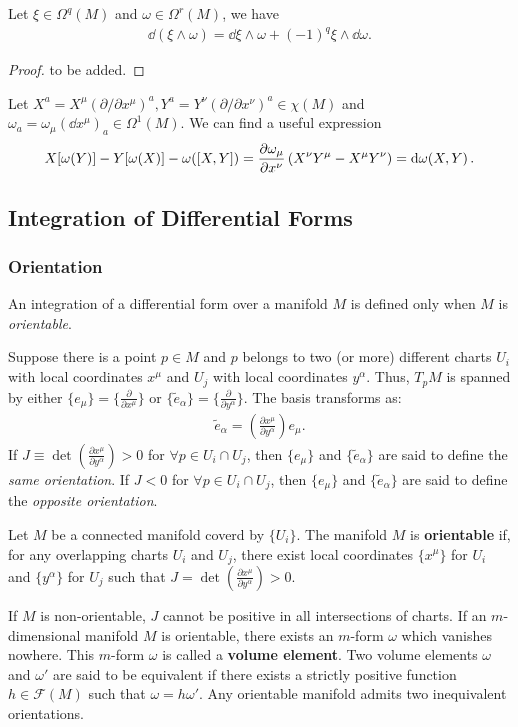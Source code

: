 \documentclass[10pt]{article}
\begin{document}
\begin{property}
    Let $\xi\in\Omega^q(M)$ and $\omega\in\Omega^r(M)$, we have
    \begin{align}
        \dd{(\xi\wedge\omega)}=\dd{\xi}\wedge\omega+(-1)^q\xi\wedge\dd{\omega}\label{exteriorderivativewedge}.
    \end{align}
\end{property}
\begin{proof}
    to be added.
\end{proof}

Let $X^a=X^\mu(\partial/\partial x^\mu)^a, Y^a=Y^\nu(\partial/\partial x^\nu)^a\in\chi(M)$ and $\omega_a=\omega_\mu(\dd{x^\mu})_a\in\Omega^1(M)$.
We can find a useful expression
\begin{align}
    X[\omega(Y)]-Y[\omega(X)]-\omega(\comm{X}{Y})=\pdv{\omega_\mu}{x^\nu} \left(X^\nu Y^\mu-X^\mu Y^\nu\right)=\dd{\omega(X,Y)}.\label{exteriorderivativeuse}
\end{align}



\subsection{Integration of Differential Forms}
\subsubsection{Orientation}
An integration of a differential form over a manifold $M$ is defined only when $M$ is \textit{orientable}.

Suppose there is a point $p\in M$ and $p$ belongs to two (or more) different charts $U_i$ with local coordinates $x^\mu$ and $U_j$ with local coordinates $y^\alpha$.
Thus, $T_p M$ is spanned by either $\{e_\mu\}=\{\frac{\partial}{\partial x^\mu}\}$ or $\{\tilde{e}_\alpha\}=\{\frac{\partial}{\partial y^\alpha}\}$.
The basis transforms as:
\begin{align}
    \tilde{e}_\alpha=\left(\frac{\partial x^\mu}{\partial y^\alpha}\right)e_{\mu}.
\end{align}
If $J\equiv\det(\frac{\partial x^\mu}{\partial y^\alpha})>0$ for $\forall p\in U_i \cap U_j$, then $\{e_\mu\}$ and $\{\tilde{e}_\alpha\}$ are said to define the \textit{same orientation}.
If $J<0$ for $\forall p\in U_i \cap U_j$, then $\{e_\mu\}$ and $\{\tilde{e}_\alpha\}$ are said to define the \textit{opposite orientation}.
\begin{definition}[Orientability]
    Let $M$ be a connected manifold coverd by $\{U_i\}$.
    The manifold $M$ is \textbf{orientable} if, for any overlapping charts $U_i$ and $U_j$, there exist local coordinates $\{x^\mu\}$ for $U_i$ and $\{y^\alpha\}$ for $U_j$ such that $J=\det(\frac{\partial x^\mu}{\partial y^\alpha})>0$.
\end{definition}
If $M$ is non-orientable, $J$ cannot be positive in all intersections of charts.
If an $m$-dimensional manifold $M$ is orientable, there exists an $m$-form $\omega$ which vanishes nowhere.
This $m$-form $\omega$ is called a \textbf{volume element}.
Two volume elements $\omega$ and $\omega'$ are said to be equivalent if there exists a strictly positive function $h \in \mathcal{F}(M)$ such that $\omega=h\omega'$.
Any orientable manifold admits two inequivalent orientations.
\end{document}
